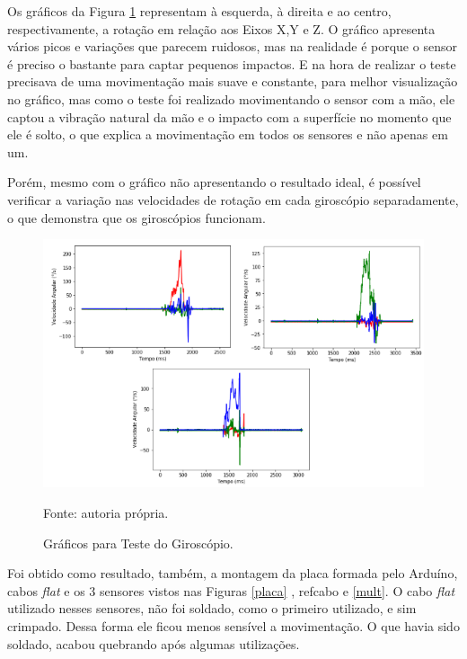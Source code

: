 	Os gráficos da Figura \ref{teste_giro} representam à esquerda, à direita e ao centro, respectivamente, a rotação em relação aos Eixos X,Y e Z. O gráfico apresenta vários picos e variações que parecem ruidosos, mas na realidade é porque o sensor é  preciso o bastante para captar pequenos impactos. E na hora de realizar o teste precisava de uma movimentação mais suave e constante, para melhor visualização no gráfico, mas como o teste foi realizado movimentando o sensor com a mão, ele captou a vibração natural da mão e o impacto com a superfície no momento que ele é solto, o que explica a movimentação em todos os sensores e não apenas em um.
	
	Porém, mesmo com o gráfico não apresentando o resultado ideal, é possível verificar a variação nas velocidades de rotação em cada giroscópio separadamente, o que demonstra que os giroscópios funcionam. 
	
	\begin{figure}[h]
		\centering
		\includegraphics[keepaspectratio=true,scale=0.6]{figuras/teste_giro.png}
		\caption{Gráficos para Teste do Giroscópio.}
		\footnotesize Fonte: autoria própria. 
		\label{teste_giro}	
			    
	\end{figure}
	
			Foi obtido como resultado, também, a montagem da placa formada pelo Arduíno, cabos \textit{flat } e os 3 sensores vistos nas Figuras \ref{placa} , ref{cabo} e  \ref{mult}. O cabo \textit{flat} utilizado nesses sensores, não foi soldado, como  o primeiro utilizado, e sim crimpado. Dessa forma ele ficou menos sensível a movimentação. O que havia sido soldado, acabou quebrando após algumas utilizações. 
		
